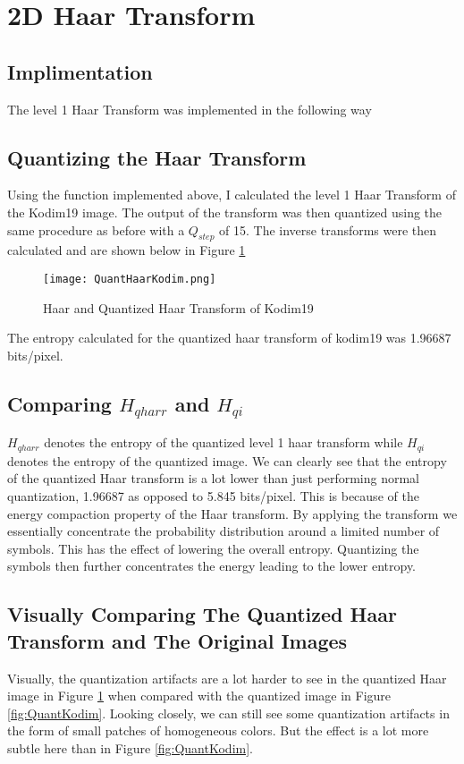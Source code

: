 \section{2D Haar Transform}
\subsection{Implimentation}
The level 1 Haar Transform was implemented in the following way



\subsection{Quantizing the Haar Transform}
Using the function implemented above, I calculated the level 1 Haar Transform of the Kodim19 image. The output of the transform was then quantized using the same procedure as before with a $Q_{step}$ of 15. The inverse transforms were then calculated and are shown below in Figure \ref{fig:QuantHaarKodim}

\begin{figure}[!h]
    \texttt{[image: QuantHaarKodim.png]}
    \centering
    \caption{Haar and Quantized Haar Transform of Kodim19}
    \label{fig:QuantHaarKodim}
\end{figure}
\noindent The entropy calculated for the quantized haar transform of kodim19 was 1.96687 bits/pixel.

\subsection{Comparing $H_{qharr}$ and $H_{qi}$}
$H_{qharr}$ denotes the entropy of the quantized level 1 haar transform while $H_{qi}$ denotes the entropy of the quantized image. We can clearly see that the entropy of the quantized Haar transform is a lot lower than just performing normal quantization, 1.96687 as opposed to 5.845 bits/pixel. This is because of the energy compaction property of the Haar transform. By applying the transform we essentially concentrate the probability distribution around a limited number of symbols. This has the effect of lowering the overall entropy. Quantizing the symbols then further concentrates the energy leading to the lower entropy.

\subsection{Visually Comparing The Quantized Haar Transform and The Original Images}
Visually, the quantization artifacts are a lot harder to see in the quantized Haar image in Figure \ref{fig:QuantHaarKodim} when compared with the quantized image in Figure \ref{fig:QuantKodim}. Looking closely, we can still see some quantization artifacts in the form of small patches of homogeneous colors. But the effect is a lot more subtle here than in Figure \ref{fig:QuantKodim}.  